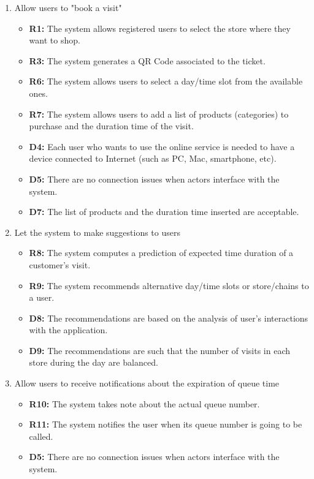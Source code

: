 \documentclass[table, 12pt]{article}
\begin{document}
\begin{enumerate}[label=\textbf{-G\arabic*}:]
{\begin{itemize}
          \end{itemize}
          }
    \item {Allow users to "book a visit"
          \begin{itemize}
              \item \textbf{R1:} The system allows registered users to select the store where they want to shop.
              \item \textbf{R3:} The system generates a QR Code associated to the ticket.
              \item \textbf{R6:} The system allows users to select a day/time slot from the available ones.
              \item \textbf{R7:} The system allows users to add a list of products (categories) to purchase and the duration time of the visit.
              \item \textbf{D4:} Each user who wants to use the online service is needed to have a device connected to Internet (such as PC, Mac, smartphone, etc).
              \item \textbf{D5:} There are no connection issues when actors interface with the system.
              \item \textbf{D7:} The list of products and the duration time inserted are acceptable.
          \end{itemize}
          }
    \item {Let the system to make suggestions to users
          \begin{itemize}
              \item \textbf{R8:} The system computes a prediction of expected time duration of a customer's visit.
              \item \textbf{R9:} The system recommends alternative day/time slots or store/chains to a user.
              \item \textbf{D8:} The recommendations are based on the analysis of user's interactions with the application.
              \item \textbf{D9:} The recommendations are such that the number of visits in each store during the day are balanced.
          \end{itemize}
          }
    \item {Allow users to receive notifications about the expiration of queue time
          \begin{itemize}
              \item \textbf{R10:} The system takes note about the actual queue number.
              \item \textbf{R11:} The system notifies the user when its queue number is going to be called.
              \item \textbf{D5:} There are no connection issues when actors interface with the system.
          \end{itemize}
          }
\end{enumerate}
\end{document}
